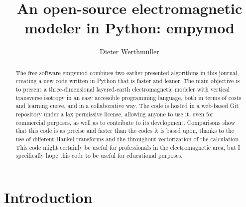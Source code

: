 \documentclass[manuscript]{geophysics}
\newcommand{\tnt}[1]{#1}
\newcommand{\python}{\tnt{Python}\xspace}
\newcommand{\empymod}{\tnt{empymod}\xspace}
\begin{document}
\title{An open-source electromagnetic modeler in Python: empymod}

\renewcommand{\thefootnote}{1}%


\address{Instituto Mexicano del Petróleo,
         Eje Central Lázaro Cárdenas Norte 152,
         Col. San Bartolo Atepehuacan C.P. 07730,
         Ciudad de México, México.
         E-mail: \href{mailto:dieter@werthmuller.org}{Dieter@Werthmuller.org}.}

\author{Dieter Werthmüller\footnotemark[1]}

\footer{}

\maketitle

\begin{abstract} %
  The free software \empymod combines two earlier presented algorithms in this
  journal, creating a new code written in \python that is faster and leaner.
  The main objective is to present a three-dimensional layered-earth
  electromagnetic modeler with vertical transverse isotropy in an easy
  accessible programming language, both in terms of costs and learning curve,
  and in a collaborative way. The code is hosted in a web-based Git repository
  under a lax permissive license, allowing anyone to use it, even for
  commercial purposes, as well as to contribute to its development.
  Comparisons show that this code is as precise and faster than the codes it is
  based upon, thanks to the use of different Hankel transforms and the
  throughout vectorization of the calculation.
  This code might certainly be useful for professionals in the electromagnetic
  area, but I specifically hope this code to be useful for educational
  purposes.
\end{abstract}

\section{Introduction}
\end{document}
